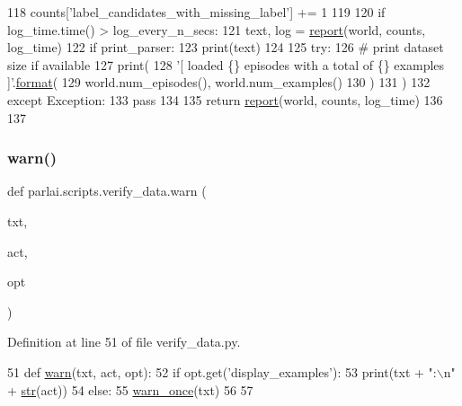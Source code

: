 \begin{DoxyCode}
118                         counts[\textcolor{stringliteral}{'label\_candidates\_with\_missing\_label'}] += 1
119 
120         \textcolor{keywordflow}{if} log\_time.time() > log\_every\_n\_secs:
121             text, log = \hyperlink{namespaceparlai_1_1scripts_1_1verify__data_a26153466b8f1f0c901768b4b3c56c885}{report}(world, counts, log\_time)
122             \textcolor{keywordflow}{if} print\_parser:
123                 print(text)
124 
125     \textcolor{keywordflow}{try}:
126         \textcolor{comment}{# print dataset size if available}
127         print(
128             \textcolor{stringliteral}{'[ loaded \{\} episodes with a total of \{\} examples ]'}.\hyperlink{namespaceparlai_1_1chat__service_1_1services_1_1messenger_1_1shared__utils_a32e2e2022b824fbaf80c747160b52a76}{format}(
129                 world.num\_episodes(), world.num\_examples()
130             )
131         )
132     \textcolor{keywordflow}{except} Exception:
133         \textcolor{keywordflow}{pass}
134 
135     \textcolor{keywordflow}{return} \hyperlink{namespaceparlai_1_1scripts_1_1verify__data_a26153466b8f1f0c901768b4b3c56c885}{report}(world, counts, log\_time)
136 
137 
\end{DoxyCode}
\mbox{\label{namespaceparlai_1_1scripts_1_1verify__data_ab1f264e6d69b1abe3399ba05512f8c66}} 
\subsubsection{\texorpdfstring{warn()}{warn()}}
{\footnotesize\ttfamily def parlai.\+scripts.\+verify\+\_\+data.\+warn (\begin{DoxyParamCaption}\item[{}]{txt,  }\item[{}]{act,  }\item[{}]{opt }\end{DoxyParamCaption})}



Definition at line 51 of file verify\+\_\+data.\+py.


\begin{DoxyCode}
51 \textcolor{keyword}{def }\hyperlink{namespaceparlai_1_1scripts_1_1verify__data_ab1f264e6d69b1abe3399ba05512f8c66}{warn}(txt, act, opt):
52     \textcolor{keywordflow}{if} opt.get(\textcolor{stringliteral}{'display\_examples'}):
53         print(txt + \textcolor{stringliteral}{":\(\backslash\)n"} + \hyperlink{namespacegenerate__task__READMEs_a5b88452ffb87b78c8c85ececebafc09f}{str}(act))
54     \textcolor{keywordflow}{else}:
55         \hyperlink{namespaceparlai_1_1utils_1_1misc_a884a3aefa90581f53bc592fa6a78dc43}{warn\_once}(txt)
56 
57 
\end{DoxyCode}


